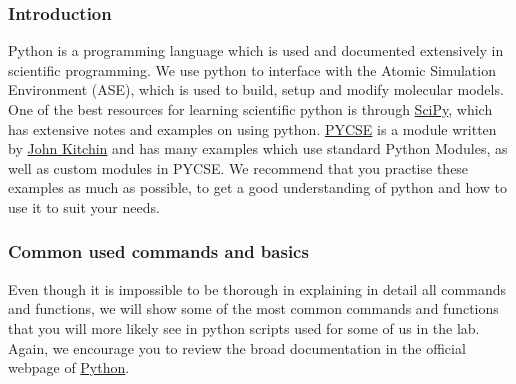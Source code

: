 \documentclass[11pt]{article}
\begin{document}
\subsubsection{Introduction}
\label{sec-2-2-1}
Python is a programming language which is used and documented extensively in scientific programming. We use python to interface with the Atomic Simulation Environment (ASE), which is used to build, setup and modify molecular models.
One of the best resources for learning scientific python is through \href{http://www.scipy-lectures.org/}{SciPy}, which has extensive notes and examples on using python. \href{http://kitchingroup.cheme.cmu.edu/pycse/pycse.html}{PYCSE} is a module written by \href{http://kitchingroup.cheme.cmu.edu/}{John Kitchin} and has many examples which use standard Python Modules, as well as custom modules in PYCSE. We recommend that you practise these examples as much as possible, to get a good understanding of python and how to use it to suit your needs. 
\subsubsection{Common used commands and basics}
\label{sec-2-2-2}
Even though it is impossible to be thorough in explaining in detail all commands and functions, we will show some of the most common commands and functions that you will more likely see in python scripts used for some of us in the lab. Again, we encourage you to review the broad documentation in the official webpage of \href{https://docs.python.org/2/}{Python}. 
\end{document}
